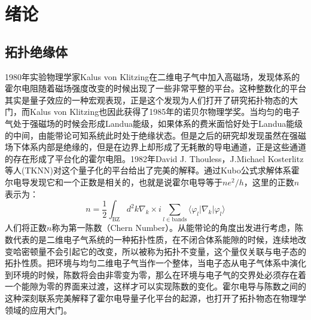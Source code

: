 \section{绪论}
\setcounter{page}{1}%
\subsection{拓扑绝缘体}
\qquad1980年实验物理学家Kalus von Klitzing在二维电子气中加入高磁场，发现体系的霍尔电阻随着磁场强度改变的时候出现了一些非常平整的平台\cite{re1}。这种整数化的平台其实是量子效应的一种宏观表现，正是这个发现为人们打开了研究拓扑物态的大门，而Kalus von Klitzing也因此获得了1985年的诺贝尔物理学奖。当均匀的电子气处于强磁场的时候会形成Landua能级，如果体系的费米面恰好处于Landua能级的中间，由能带论可知系统此时处于绝缘状态。但是之后的研究却发现虽然在强磁场下体系内部是绝缘的，但是在边界上却形成了无耗散的导电通道，正是这些通道的存在形成了平台化的霍尔电阻。1982年David J. Thouless，J.Michael Kosterlitz等人(TKNN)对这个量子化的平台给出了完美的解释\cite{re2}。通过Kubo公式求解体系霍尔电导发现它和一个正数是相关的，也就是说霍尔电导等于$ne^2/h$，这里的正数$n$表示为：
\begin{equation}	
n=\frac{1}{2}\int_{\mathrm{BZ}}d^2k\nabla_k\times i\sum_{l\in\mathrm{bands}}\langle\varphi_l|\nabla_k|\varphi_l\rangle
\end{equation}
人们将正数$n$称为第一陈数（Chern Number）。从能带论的角度出发进行考虑，陈数代表的是二维电子气系统的一种拓扑性质，在不闭合体系能隙的时候，连续地改变哈密顿量不会引起它的改变，所以被称为拓扑不变量，这个量仅关联与电子态的拓扑性质。把环境与均匀二维电子气当作一个整体，当电子态从电子气体系中演化到环境的时候，陈数将会由非零变为零，那么在环境与电子气的交界处必须存在着一个能隙为零的界面来过渡，这样才可以实现陈数的变化。霍尔电导与陈数之间的这种深刻联系完美解释了霍尔电导量子化平台的起源，也打开了拓扑物态在物理学领域的应用大门。
